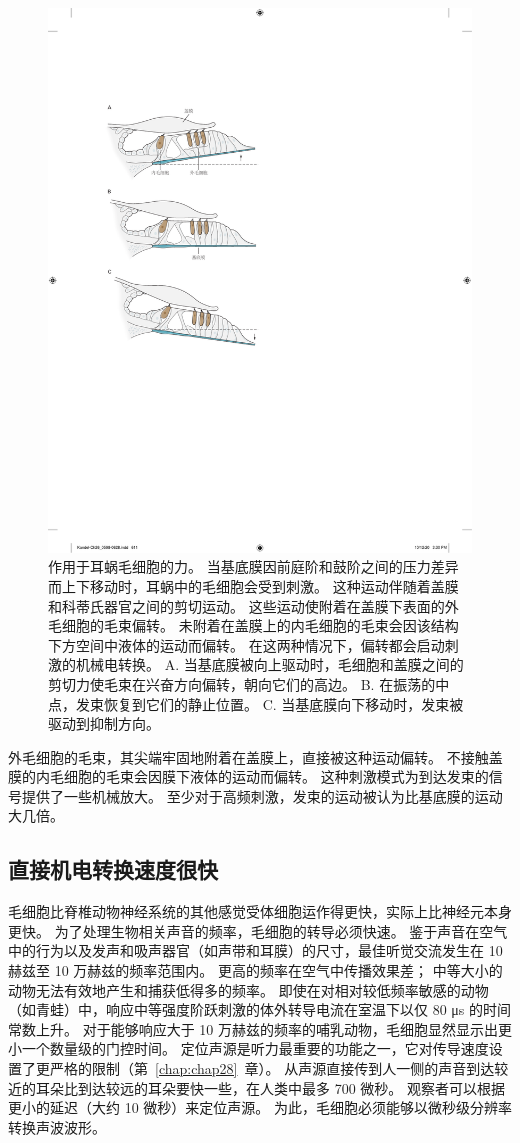 \begin{figure}[htbp]
	\centering
	\includegraphics[width=0.5\linewidth]{chap26/fig_26_9}
	\caption{作用于耳蜗毛细胞的力。
		当基底膜因前庭阶和鼓阶之间的压力差异而上下移动时，耳蜗中的毛细胞会受到刺激。
		这种运动伴随着盖膜和科蒂氏器官之间的剪切运动。 
		这些运动使附着在盖膜下表面的外毛细胞的毛束偏转。
		未附着在盖膜上的内毛细胞的毛束会因该结构下方空间中液体的运动而偏转。
		在这两种情况下，偏转都会启动刺激的机械电转换。
		A. 当基底膜被向上驱动时，毛细胞和盖膜之间的剪切力使毛束在兴奋方向偏转，朝向它们的高边。
		B. 在振荡的中点，发束恢复到它们的静止位置。
		C. 当基底膜向下移动时，发束被驱动到抑制方向。}
	\label{fig:26_9}
\end{figure}


外毛细胞的毛束，其尖端牢固地附着在盖膜上，直接被这种运动偏转。
不接触盖膜的内毛细胞的毛束会因膜下液体的运动而偏转。
这种刺激模式为到达发束的信号提供了一些机械放大。
至少对于高频刺激，发束的运动被认为比基底膜的运动大几倍。



\subsection{直接机电转换速度很快}

毛细胞比脊椎动物神经系统的其他感觉受体细胞运作得更快，实际上比神经元本身更快。
为了处理生物相关声音的频率，毛细胞的转导必须快速。 
鉴于声音在空气中的行为以及发声和吸声器官（如声带和耳膜）的尺寸，最佳听觉交流发生在 10 赫兹至 10 万赫兹的频率范围内。
更高的频率在空气中传播效果差；
中等大小的动物无法有效地产生和捕获低得多的频率。
即使在对相对较低频率敏感的动物（如青蛙）中，响应中等强度阶跃刺激的体外转导电流在室温下以仅 80 μs 的时间常数上升。
对于能够响应大于 10 万赫兹的频率的哺乳动物，毛细胞显然显示出更小一个数量级的门控时间。
定位声源是听力最重要的功能之一，它对传导速度设置了更严格的限制（第~\ref{chap:chap28}~章）。
从声源直接传到人一侧的声音到达较近的耳朵比到达较远的耳朵要快一些，在人类中最多 700 微秒。
观察者可以根据更小的延迟（大约 10 微秒）来定位声源。
为此，毛细胞必须能够以微秒级分辨率转换声波波形。



